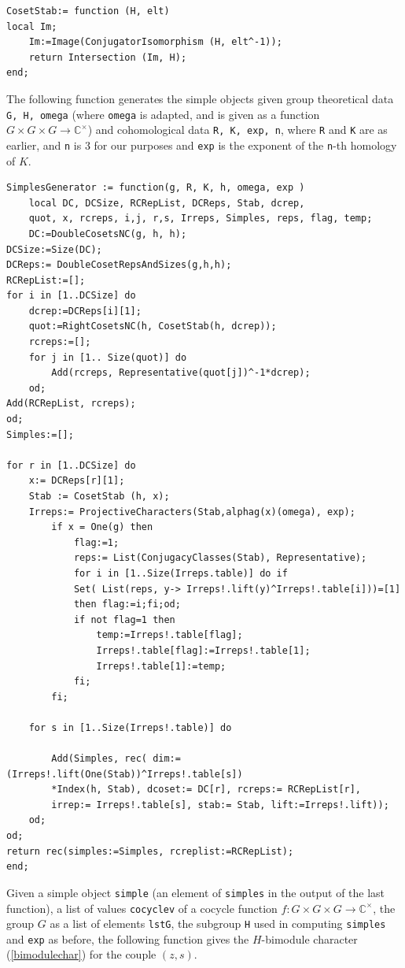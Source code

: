 \documentclass[a4paper, 10pt]{book}
\theoremstyle{definition}
\numberwithin{equation}{chapter}
\newcommand\lstl{\lstinline}
\newcommand\CC{\mathbb C}
\newcommand{\ra}\rightarrow
\begin{document}
\begin{lstlisting}
CosetStab:= function (H, elt)
local Im;
	Im:=Image(ConjugatorIsomorphism (H, elt^-1));
	return Intersection (Im, H);	
end;	
\end{lstlisting}
The following function generates the simple objects given group theoretical data \lstl{G, H, omega} (where \lstl{omega} is adapted, and is given as a function $G\times G \times G \ra \CC^\times$) and cohomological data \lstl{R, K, exp, n}, where \lstl{R} and \lstl{K} are as earlier, and \lstl{n} is 3 for our purposes and \lstl{exp} is the exponent of the \lstl{n}-th homology of $K$.
\begin{lstlisting}
SimplesGenerator := function(g, R, K, h, omega, exp ) 
    local DC, DCSize, RCRepList, DCReps, Stab, dcrep, 
    quot, x, rcreps, i,j, r,s, Irreps, Simples, reps, flag, temp;
	DC:=DoubleCosetsNC(g, h, h); 
DCSize:=Size(DC); 
DCReps:= DoubleCosetRepsAndSizes(g,h,h);
RCRepList:=[]; 
for i in [1..DCSize] do
	dcrep:=DCReps[i][1];
	quot:=RightCosetsNC(h, CosetStab(h, dcrep));
	rcreps:=[];
	for j in [1.. Size(quot)] do
		Add(rcreps, Representative(quot[j])^-1*dcrep);
	od;
Add(RCRepList, rcreps);
od;
Simples:=[];

for r in [1..DCSize] do
	x:= DCReps[r][1];
	Stab := CosetStab (h, x);
	Irreps:= ProjectiveCharacters(Stab,alphag(x)(omega), exp);
        if x = One(g) then
            flag:=1;
            reps:= List(ConjugacyClasses(Stab), Representative);
            for i in [1..Size(Irreps.table)] do if 
            Set( List(reps, y-> Irreps!.lift(y)^Irreps!.table[i]))=[1] 
            then flag:=i;fi;od;
            if not flag=1 then 
                temp:=Irreps!.table[flag];
                Irreps!.table[flag]:=Irreps!.table[1];
                Irreps!.table[1]:=temp;
            fi;
        fi;
        
	for s in [1..Size(Irreps!.table)] do
            
		Add(Simples, rec( dim:=(Irreps!.lift(One(Stab))^Irreps!.table[s])
		*Index(h, Stab), dcoset:= DC[r], rcreps:= RCRepList[r], 
		irrep:= Irreps!.table[s], stab:= Stab, lift:=Irreps!.lift));
	od;
od;
return rec(simples:=Simples, rcreplist:=RCRepList);
end;
\end{lstlisting}
Given a simple object \lstl{simple} (an element of \lstl{simples} in the output of the last function), a list of values  \lstl{cocyclev}  of a cocycle function $f: G\times G \times G\ra \CC^\times$, the group $G$ as a list of elements \lstl{lstG}, the subgroup \lstl{H} used in computing \lstl{simples} and \lstl{exp}  as before, the following function gives the $H$-bimodule character (\ref{bimodulechar}) for the couple $(z, s)$.
\end{document}
